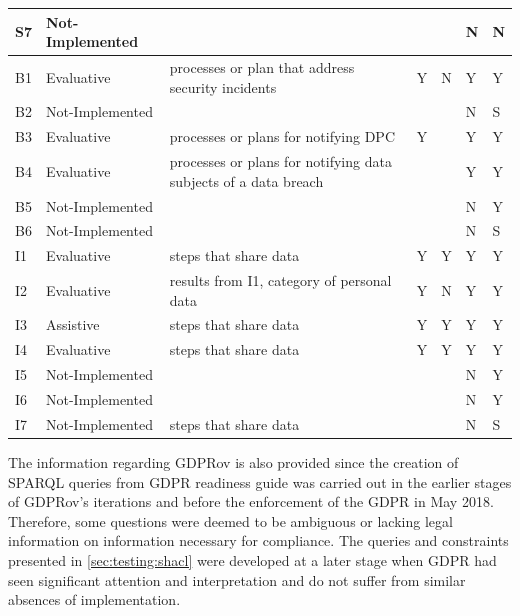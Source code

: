 \begin{center}
\begin{tabularx}{\textwidth}{|l|l|X|l|l|l|l|}
S7 & Not-Implemented &  &  &  & N & N \\ \hline
B1 & Evaluative & processes or plan that address security incidents & Y & N & Y & Y \\ \hline
B2 & Not-Implemented &  &  &  & N & S \\ \hline
B3 & Evaluative & processes or plans for notifying DPC & Y &  & Y & Y \\ \hline
B4 & Evaluative & processes or plans for notifying data subjects of a data breach &  &  & Y & Y \\ \hline
B5 & Not-Implemented &  &  &  & N & Y \\ \hline
B6 & Not-Implemented &  &  &  & N & S \\ \hline
I1 & Evaluative & steps that share data & Y & Y & Y & Y \\ \hline
I2 & Evaluative & results from I1, category of personal data & Y & N & Y & Y \\ \hline
I3 & Assistive & steps that share data & Y & Y & Y & Y \\ \hline
I4 & Evaluative & steps that share data & Y & Y & Y & Y \\ \hline
I5 & Not-Implemented &  &  &  & N & Y \\ \hline
I6 & Not-Implemented &  &  &  & N & Y \\ \hline
I7 & Not-Implemented & steps that share data &  &  & N & S \\ \hline
\end{tabularx}
\end{center}

The information regarding GDPRov is also provided since the creation of SPARQL queries from GDPR readiness guide was carried out in the earlier stages of GDPRov's iterations and before the enforcement of the GDPR in May 2018. Therefore, some questions were deemed to be ambiguous or lacking legal information on information necessary for compliance.
The queries and constraints presented in \autoref{sec:testing:shacl} were developed at a later stage when GDPR had seen significant attention and interpretation and do not suffer from similar absences of implementation.


